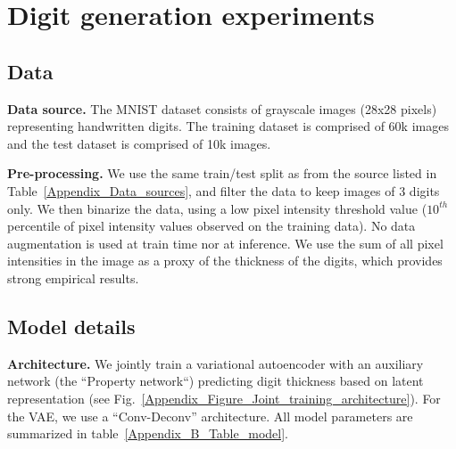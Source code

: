 
\section{Digit generation experiments}
\label{Appendix_B_Digit_generation}

\subsection{Data}
\label{Appendix_B.1_Digit_generation_Data}

\textbf{Data source.} The MNIST \citep{Lecun1998MNIST} dataset consists of grayscale images (28x28 pixels) representing handwritten digits. The training dataset is comprised of 60k images and the test dataset is comprised of 10k images.

\textbf{Pre-processing.} We use the same train/test split as from the source listed in Table~\ref{Appendix_Data_sources}, and filter the data to keep images of 3 digits only. We then binarize the data, using a low pixel intensity threshold value ($10^{th}$ percentile of pixel intensity values observed on the training data). No data augmentation is used at train time nor at inference. We use the sum of all pixel intensities in the image as a proxy of the thickness of the digits, which provides strong empirical results.

\subsection{Model details}
\label{Appendix_B.2_Digit_generation_Model}

\textbf{Architecture.} We jointly train a variational autoencoder with an auxiliary network (the ``Property network``) predicting digit thickness based on latent representation (see  Fig.~\ref{Appendix_Figure_Joint_training_architecture}). For the VAE, we use a ``Conv-Deconv'' architecture\citep{Higgins2017}. All model parameters are summarized in table~\ref{Appendix_B_Table_model}.

